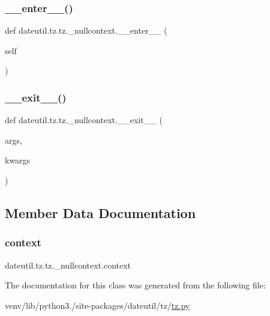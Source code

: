 \subsubsection{\texorpdfstring{\+\_\+\+\_\+enter\+\_\+\+\_\+()}{\_\_enter\_\_()}}
{\footnotesize\ttfamily def dateutil.\+tz.\+tz.\+\_\+nullcontext.\+\_\+\+\_\+enter\+\_\+\+\_\+ (\begin{DoxyParamCaption}\item[{}]{self }\end{DoxyParamCaption})}

\mbox{\label{classdateutil_1_1tz_1_1tz_1_1__nullcontext_abbdf52ea291cbeb0b9997ba2225e8825}} 
\subsubsection{\texorpdfstring{\+\_\+\+\_\+exit\+\_\+\+\_\+()}{\_\_exit\_\_()}}
{\footnotesize\ttfamily def dateutil.\+tz.\+tz.\+\_\+nullcontext.\+\_\+\+\_\+exit\+\_\+\+\_\+ (\begin{DoxyParamCaption}\item[{}]{args,  }\item[{}]{kwargs }\end{DoxyParamCaption})}



\subsection{Member Data Documentation}
\mbox{\label{classdateutil_1_1tz_1_1tz_1_1__nullcontext_abd282f262c7156ea82af1261fbc392b7}} 
\subsubsection{\texorpdfstring{context}{context}}
{\footnotesize\ttfamily dateutil.\+tz.\+tz.\+\_\+nullcontext.\+context}



The documentation for this class was generated from the following file\+:\begin{DoxyCompactItemize}
\item 
venv/lib/python3./site-\/packages/dateutil/tz/\hyperlink{tz_8py}{tz.\+py}\end{DoxyCompactItemize}
